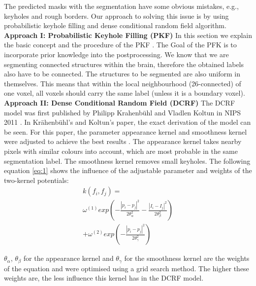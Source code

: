 \documentclass[journal]{IEEEtran}
\begin{document}
The predicted masks with the segmentation have some obvious mistakes, e.g., keyholes and rough borders. Our approach to solving this issue is by using probabilistic keyhole filling and dense conditional random field algorithm. 
\newline
\textbf{Approach I: Probabilistic Keyhole Filling (PKF)}
\newline
In this section we explain the basic concept and the procedure of the PKF . The Goal of the PFK is to incorporate prior knowledge into the postprocessing. We know that we are segmenting connected structures within the brain, therefore the obtained labels also have to be connected. The structures to be segmented are also uniform in themselves.
This means that within the local neighbourhood (26-connected) of one voxel, all voxels should carry the same label (unless it is a boundary voxel).
\newline
\textbf{Approach II: Dense Conditional Random Field (DCRF)}
\newline
The DCRF model was first published by Philipp Krahenbühl and Vladlen Koltun in NIPS 2011 \cite{Krahenbuhl2012}. In Krähenbühl’s and Koltun’s paper, the exact derivation of the model can be seen. For this paper, the parameter appearance kernel and smoothness kernel were adjusted to achieve the best results . The appearance kernel takes nearby pixels with similar colours into account, which are most probable in the same segmentation label. The smoothness kernel removes small keyholes. The following equation \ref{eq:1} shows the influence of the adjustable parameter and weights of the two-kernel potentials:
\begin{multline}\label{eq:1}
    k\left(f_i,f_j\right)=\\
\omega^{\left(1\right)}  exp\left(-\frac{\left| p_i - p_j\right|^2}{2\theta^2_\alpha}-\frac{\left| I_i-I_j\right|^2}{2\theta^2_\beta}\right)\\
+\omega^{\left(2\right)}exp\left(-\frac{\left|p_i-p_j\right|^2}{2\theta^2_\gamma}\right)
\end{multline}

$\theta_\alpha$, $\theta_\beta$ for the appearance kernel and $\theta_\gamma$ for the smoothness kernel are the weights of the equation and were optimised using a grid search method. The higher these weights are, the less influence this kernel has in the DCRF model.
\end{document}
